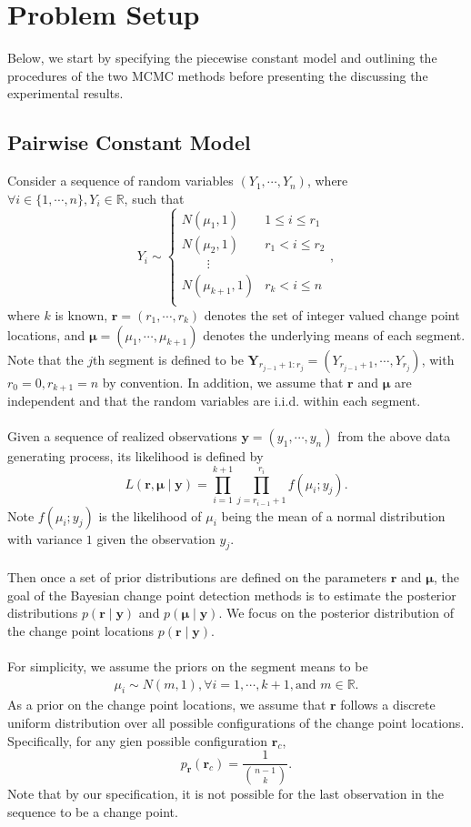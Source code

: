 

\section{Problem Setup}
Below, we start by specifying the piecewise constant model and outlining the procedures of the two MCMC methods before presenting the discussing the experimental results.
\subsection{Pairwise Constant Model}
Consider a sequence of random variables $(Y_1,\cdots,Y_n)$, where $\forall i \in \{1,\cdots,n\}, Y_i \in \mathbb{R}$, such that
\[
Y_i \sim \begin{cases}
N(\mu_1,1) & 1 \leq i \leq r_1 \\
N(\mu_2,1) & r_1 < i \leq r_2 \\
\quad \quad \vdots \\
N(\mu_{k+1},1) & r_k < i \leq n \\
\end{cases},
\]
where $k$ is known, $\bm{r} = (r_1,\cdots,r_k)$ denotes the set of integer valued change point locations, and $\bm{\mu} = (\mu_1,\cdots,\mu_{k+1})$ denotes the underlying means of each segment. Note that the $j$th segment is defined to be $\bm{Y}_{r_{j-1}+1 : r_j} = (Y_{r_{j-1}+1}, \cdots, Y_{r_j})$, with $r_0 = 0, r_{k+1} = n$ by convention. In addition, we assume that $\bm{r}$ and $\bm{\mu}$ are independent and that the random variables are i.i.d. within each segment.\\\\
Given a sequence of realized observations $\bm{y} = (y_1,\cdots,y_n)$ from the above data generating process, its likelihood is defined by
\[
L( \bm{r}, \bm{\mu} \mid \bm{y} ) = \prod_{i=1}^{k+1}\prod_{j=r_{i-1}+1}^{r_i} f(\mu_i; y_j).
\]
Note $f(\mu_i; y_j)$ is the likelihood of $\mu_i$ being the mean of a normal distribution with variance $1$ given the observation $y_j$.\\\\
Then once a set of prior distributions are defined on the parameters $\bm{r}$ and $\bm{\mu}$, the goal of the Bayesian change point detection methods is to estimate the posterior distributions $p(\bm{r} \mid \bm{y})$ and $p(\bm{\mu} \mid \bm{y})$. We focus on the posterior distribution of the change point locations $p(\bm{r} \mid \bm{y})$.\\\\
For simplicity, we assume the priors on the segment means to be
\begin{align}\label{eqn:prior}
\mu_i \sim N(m, 1), \forall i=1,\cdots,k+1, \text{and } m\in \mathbb{R}.
\end{align}
As a prior on the change point locations, we assume that $\bm{r}$ follows a discrete uniform distribution over all possible configurations of the change point locations. Specifically, for any gien possible configuration $\bm{r}_c$,
\[
p_{\bm{r}}(\bm{r}_c) = \frac{1}{\binom{n-1}{k}}.
\]
Note that by our specification, it is not possible for the last observation in the sequence to be a change point.
